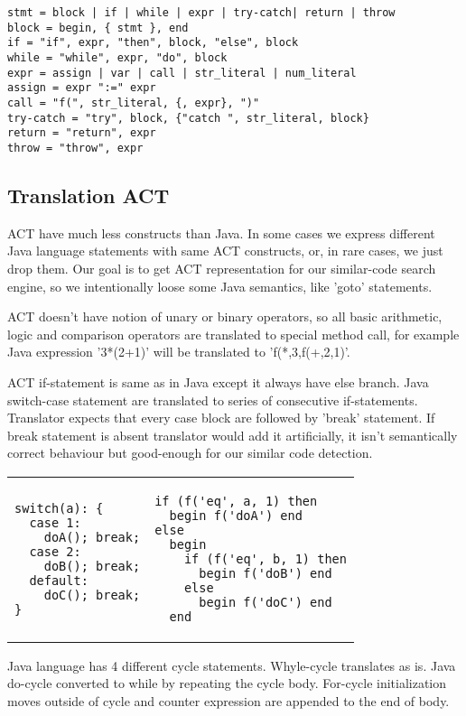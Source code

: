 \begin{verbatim}
stmt = block | if | while | expr | try-catch| return | throw
block = begin, { stmt }, end
if = "if", expr, "then", block, "else", block
while = "while", expr, "do", block
expr = assign | var | call | str_literal | num_literal
assign = expr ":=" expr
call = "f(", str_literal, {, expr}, ")"
try-catch = "try", block, {"catch ", str_literal, block}
return = "return", expr
throw = "throw", expr
\end{verbatim}

\subsection{Translation ACT}

ACT have much less constructs than Java. In some cases we express different Java language statements with same ACT
constructs, or, in rare cases, we just drop them. Our goal is to get ACT representation for our
similar-code search engine, so we intentionally loose some Java semantics, like 'goto' statements.

ACT doesn't have notion of unary or binary operators, so all basic arithmetic, logic and comparison operators 
are translated to special method call, for example Java expression '3*(2+1)' will be translated to 'f(*,3,f(+,2,1)'.

ACT if-statement is same as in Java except it always have else branch. Java switch-case statement are translated to
series of consecutive if-statements. Translator expects that every case block are followed by 'break' statement.
If break statement is absent translator would add it artificially, it isn't semantically correct behaviour but
good-enough for our similar code detection.

\begin{tabular}{ p{6cm} p{6cm} }
\begin{verbatim}
switch(a): {
  case 1:
  	doA(); break;
  case 2:
    doB(); break;
  default:
  	doC(); break;
}
\end{verbatim} 
  & 
\begin{verbatim}
if (f('eq', a, 1) then 
  begin f('doA') end
else 
  begin
    if (f('eq', b, 1) then
      begin f('doB') end 
    else
      begin f('doC') end
  end
\end{verbatim}
\end{tabular}

Java language has 4 different cycle statements. Whyle-cycle translates as is. Java do-cycle converted to
while by repeating the cycle body. For-cycle initialization moves outside of cycle and counter expression are
appended to the end of body.

